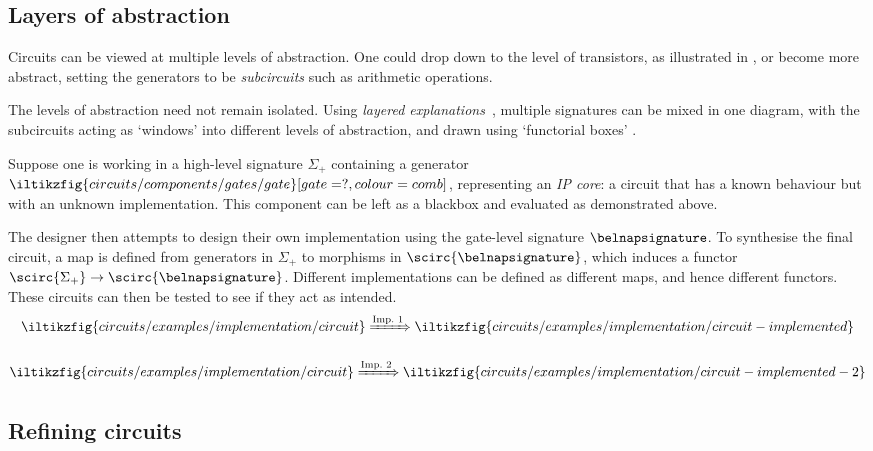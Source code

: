 \documentclass{lmcs}
\begin{document}
\subsection{Layers of abstraction}\label{sec:abstraction}

Circuits can be viewed at multiple levels of abstraction.
One could drop down to the level of transistors, as illustrated in
\cite[Sec.\ 4.1]{ghica2017diagrammatic}, or become more abstract, setting the
generators to be \emph{subcircuits} such as arithmetic operations.

The levels of abstraction need not remain isolated.
Using \emph{layered explanations}~\cite{lobski2022string}, multiple signatures
can be mixed in one diagram, with the subcircuits acting as `windows' into
different levels of abstraction, and drawn using `functorial boxes'
\cite{mellies2006functorial}.

\begin{exa}[Implementation]
    Suppose one is working in a high-level signature \(\Sigma_+\) containing a
    generator \(
    \iltikzfig{circuits/components/gates/gate}[gate=?,colour=comb]
    \), representing an \emph{IP core}: a circuit that has a known behaviour but
    with an unknown implementation.
    This component can be left as a blackbox and evaluated as
    demonstrated above.

    The designer then attempts to design their own implementation using the
    gate-level signature \(\belnapsignature\).
    To synthesise the final circuit, a map is defined from generators in \(
    \Sigma_+
    \) to morphisms in \(\scirc{\belnapsignature}\), which induces a functor
    \(\scirc{\Sigma_+} \to \scirc{\belnapsignature}\).
    Different implementations can be defined as different maps, and hence
    different functors.
    These circuits can then be tested to see if they act as intended.
    \begin{gather*}
        \iltikzfig{circuits/examples/implementation/circuit}
        \xRightarrow{\text{Imp.\ 1}}
        \iltikzfig{circuits/examples/implementation/circuit-implemented}
        \\[1em]
        \iltikzfig{circuits/examples/implementation/circuit}
        \xRightarrow{\text{Imp.\ 2}}
        \iltikzfig{circuits/examples/implementation/circuit-implemented-2}
    \end{gather*}
\end{exa}

\subsection{Refining circuits}\label{sec:refining}
\end{document}
